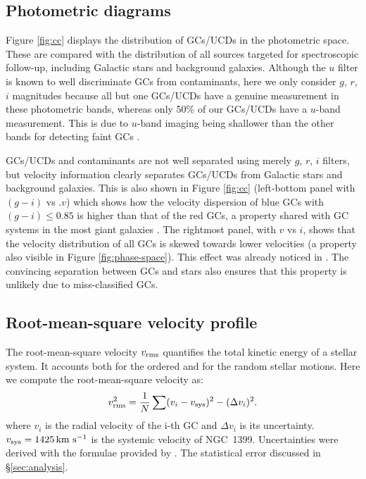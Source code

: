 \documentclass[useAMS,usenatbib]{mn2e}
\newcommand{\kms}{\mbox{\,km~s$^{-1}$}}
\begin{document}
\subsection{Photometric diagrams}


Figure \ref{fig:cc} displays the distribution of GCs/UCDs in the photometric 
space. These are compared with the distribution of all sources targeted for 
spectroscopic follow-up, including Galactic stars and background galaxies. 
Although the $u$ filter is known to well discriminate GCs from contaminants, 
here we only consider $g$, $r$, $i$ magnitudes because all but one GCs/UCDs 
have a genuine measurement in these photometric bands, whereas only 50\% of our 
GCs/UCDs have a $u$-band measurement. This is due to $u$-band imaging being 
shallower than the other bands for detecting faint GCs \citep{DAbrusco16}.

GCs/UCDs and contaminants are not well separated using merely $g$, $r$, $i$ 
filters, but velocity information clearly separates GCs/UCDs from Galactic 
stars and background galaxies. This is also shown in Figure \ref{fig:cc} 
(left-bottom panel with $(g-i)$ vs .$v$) which shows how the velocity 
dispersion of blue GCs with $(g-i) \le 0.85$ is higher than that of the red GCs, a 
property shared with GC systems in the most giant galaxies \citep[e.g.,][]{Pota13}. 
The rightmost panel, with $v$ vs $i$, shows that 
the velocity distribution of all GCs is skewed towards lower velocities (a 
property also visible in Figure \ref{fig:phase-space}). This effect was already 
noticed in \citet{Schuberth}. The convincing separation between GCs and stars 
also ensures that this property is unlikely due to miss-classified GCs. 

\subsection{Root-mean-square velocity profile}
The root-mean-square velocity $v_{\rm rms}$ quantifies the total kinetic energy 
of a stellar system. It accounts both for the ordered and for the random 
stellar motions. Here we compute the root-mean-square velocity as:
\begin{equation}
v_{\rm rms}^2 = \frac{1}{N}  \sum (v_i - v_{\rm sys})^2 - (\Delta v_i)^2 .
\label{eq:sigma}
\end{equation}
where $v_i$ is the radial velocity of the i-th GC and $\Delta v_i$ is its 
uncertainty. $v_{\rm sys}=1425 \kms$ is the systemic velocity of NGC~1399. 
Uncertainties were derived with the formulae provided by \citet{Danese}. 
The statistical error discussed in \S \ref{sec:analysis}.
\end{document}
